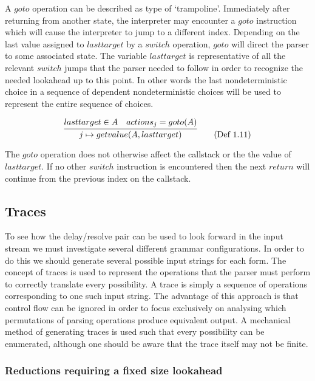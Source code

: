 \documentclass[envcountsame,runningheads]{llncs}
\begin{document}
A $goto$ operation can be described as type of `trampoline'. 
Immediately after returning from another state, the interpreter may encounter a $goto$ instruction which will cause the interpreter to jump to a different index.
Depending on the last value assigned to $lasttarget$ by a $switch$ operation, $goto$ will direct the parser to some associated state. 
The variable $lasttarget$ is representative of all the relevant $switch$ jumps that the parser needed to follow in order to recognize the needed lookahead up to this point.
In other words the last nondeterministic choice in a sequence of dependent nondeterministic choices will be used to represent the entire sequence of choices.

\begin{equation}
\infer{j \mapsto getvalue(A, lasttarget)}{lasttarget \in A & actions_j = goto(A)} \tag{Def 1.11}
\end{equation}

The $goto$ operation does not otherwise affect the callstack or the the value of $lasttarget$. 
If no other $switch$ instruction is encountered then the next $return$ will continue from the previous index on the callstack.

\subsection{Traces}
To see how the delay/resolve pair can be used to look forward in the input stream we must investigate several different grammar configurations.
In order to do this we should generate several possible input strings for each form.
The concept of traces is used to represent the operations that the parser must perform to correctly translate every possibility.
A trace is simply a sequence of operations corresponding to one such input string.
The advantage of this approach is that control flow can be ignored in order to focus exclusively on analysing which permutations of parsing operations produce equivalent output.
A mechanical method of generating traces is used such that every possibility can be enumerated, although one should be aware that the trace itself may not be finite.\\

\subsubsection{Reductions requiring a fixed size lookahead}
\end{document}
